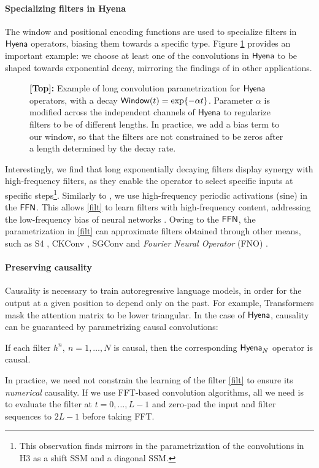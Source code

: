 \paragraph{Specializing filters in Hyena}
%
The window and positional encoding functions are used to specialize filters in ${\sf Hyena}$ operators, biasing them towards a specific type. Figure \ref{fig:modul} provides an important example: we choose at least one of the convolutions in ${\sf Hyena}$ to be shaped towards exponential decay, mirroring the findings of \citep{li2022makes} in other applications.
%
\begin{figure}[t]
    \centering
    
    \vspace{-4mm}
    \caption{\textbf{[Top]:} Example of long convolution parametrization for ${\sf Hyena}$ operators, with a decay ${\sf Window}(t) = \exp\{- \alpha t\}$. Parameter $\alpha$ is modified across the independent channels of ${\sf Hyena}$ to regularize filters to be of different lengths. In practice, we add a bias term to our window, so that the filters are not constrained to be zeros after a length determined by the decay rate. 
    }
    \vspace{-4mm}
    \label{fig:modul}
\end{figure}
%
Interestingly, we find that long exponentially decaying filters display synergy with high-frequency filters, as they enable the operator to select specific inputs at specific steps\footnote{This observation finds mirrors in the parametrization of the convolutions in H3 \citep{dao2022hungry} as a shift SSM and a diagonal SSM.}. Similarly to \citep{romero2021ckconv}, we use high-frequency periodic activations (sine) in the {$\sf FFN$}. This allows \eqref{filt} to learn filters with high-frequency content, addressing the low-frequency bias of neural networks \citep{basri2020frequency}.
%
Owing to the {$\sf FFN$}, the parametrization in \eqref{filt} can approximate filters obtained through other means, such as S4 \citep{gu2020hippo,gu2021efficiently}, CKConv \citep{romero2021ckconv}, SGConv \citep{li2022makes} and \textit{Fourier Neural Operator} (FNO) \citep{li2020fourier}.
%

\paragraph{Preserving causality}
%
Causality is necessary to train autoregressive language models, in order for the output at a given position to depend only on the past. For example, Transformers mask the attention matrix to be lower triangular. In the case of ${\sf Hyena}$, causality can be guaranteed by parametrizing causal convolutions: 
%
\begin{proposition}\label{prop:causality}
    If each filter $h^n, ~n=1,\dots, N$ is causal, then the corresponding ${\sf Hyena}_N$ operator is causal.
\end{proposition}
%
In practice, we need not constrain the learning of the filter \eqref{filt} to ensure its \textit{numerical} causality. If we use FFT-based convolution algorithms, all we need is to evaluate the filter at $t=0,\dots,L-1$ and zero-pad the input and filter sequences to $2 L - 1$ before taking FFT. 
%
